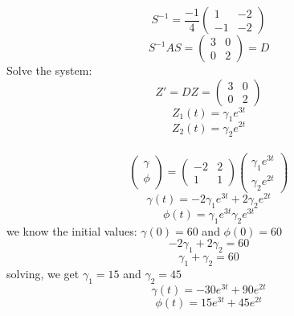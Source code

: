 \documentclass{article}
\begin{document}
\begin{equation*} S^{-1} = \frac{-1}{4}\begin{pmatrix} 1 & -2 \\ -1 & -2 \end{pmatrix}\end{equation*}
\begin{equation*} S^{-1}AS = \begin{pmatrix} 3 & 0 \\ 0 & 2 \end{pmatrix} = D \end{equation*}
Solve the system: \begin{equation*} Z' = DZ = \begin{pmatrix} 3 & 0 \\ 0 & 2 \end{pmatrix} \end{equation*}
\begin{equation*} Z_1(t) = \gamma_1 e^{3t} \end{equation*}
\begin{equation*} Z_2(t) = \gamma_2 e^{2t} \end{equation*}
\\[2mm]
\begin{equation*} \begin{pmatrix} \gamma \\[6pt] \phi  \end{pmatrix} = \begin{pmatrix} -2 & 2 \\[6pt] 1 & 1 \end{pmatrix} \begin{pmatrix} \gamma_1 e^{3t} \\[6pt] \gamma_2 e^{2t} \end{pmatrix} \end{equation*}
\begin{equation*} \gamma(t) = -2 \gamma_1 e^{3t} + 2 \gamma_2 e^{2t} \end{equation*}
\begin{equation*} \phi(t) = \gamma_1 e^{3t} \gamma_2 e^{3t} \end{equation*}
we know the initial values: $\gamma(0) = 60$ and $\phi(0) = 60$ \newline
\begin{equation*} -2\gamma_1 + 2\gamma_2 = 60\end{equation*}
\begin{equation*} \gamma_1 + \gamma_2 = 60 \end{equation*} 
solving, we get $\gamma_1 = 15$ and $\gamma_2 = 45$
\begin{equation*} \gamma(t) = -30 e^{3t} + 90 e^{2t} \end{equation*}
\begin{equation*} \phi(t) = 15 e^{3t} + 45 e^{2t} \end{equation*}
\normalsize
\pagestyle{otherpages}
\end{document}
